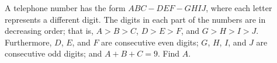 A telephone number has the form $ABC - DEF - GHIJ$, where each letter represents a different digit. The digits in each part of the numbers are in decreasing order; that is, $A > B > C$, $D > E > F$, and $G > H > I > J$. Furthermore, $D$, $E$, and $F$ are consecutive even digits; $G$, $H$, $I$, and $J$ are consecutive odd digits; and $A + B + C = 9$. Find $A$.
